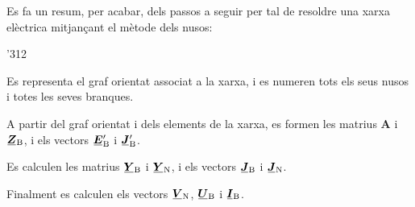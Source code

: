 Es fa un resum, per acabar, dels passos a seguir per tal de resoldre una
xarxa elèctrica mitjançant el mètode dels nusos:
\begin{dingautolist}{'312}
   \item Es representa el graf orientat associat a la xarxa, i es numeren tots els seus nusos i totes les seves branques.
   \item A partir del graf orientat i dels elements de la xarxa, es formen les matrius $\boldsymbol{A}$ i $\mcmplx{Z}\ped{B}$, i els vectors $\mcmplx{E}\ped{B}'$ i $\mcmplx{J}\ped{B}'$.
   \item Es calculen les matrius $\mcmplx{Y}\ped{B}$ i $\mcmplx{Y}\ped{N}$, i els vectors $\mcmplx{J}\ped{B}$ i $\mcmplx{J}\ped{N}$.
   \item Finalment es calculen els vectors $\mcmplx{V}\ped{N}$, $\mcmplx{U}\ped{B}$ i $\mcmplx{I}\ped{B}$.
\end{dingautolist}


